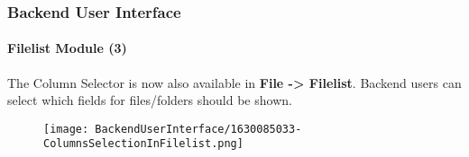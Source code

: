 %

\begin{frame}[fragile]
	\frametitle{Backend User Interface}
	\framesubtitle{Filelist Module (3)}

	The Column Selector is now also available in \textbf{File -> Filelist}.
	Backend users can select which fields for files/folders should be shown.

	\begin{figure}
		\texttt{[image: BackendUserInterface/1630085033-ColumnsSelectionInFilelist.png]}
	\end{figure}

\end{frame}

